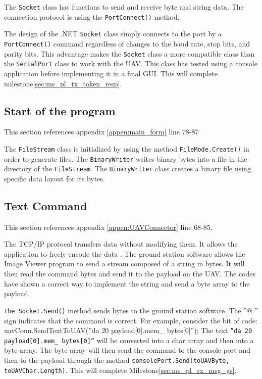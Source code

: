 The \texttt{Socket} class has functions to send and receive byte and string data. The connection protocol is using the \texttt{PortConnect()} method.  
        
The design of the .NET \texttt{Socket} class simply connects to the port by a \texttt{PortConnect()} command regardless of changes to the baud rate, stop bits, and parity bits. 
This advantage makes the \texttt{Socket} class a more compatible class than the \texttt{SerialPort} class to work with the UAV.
This class has tested using a console application before implementing it in a final GUI. 
This will complete milestone\ref{sec:ms_pl_tx_token_resp}.

\subsection{Start of the program}
This section references appendix \ref{appen:main_form} line 78-87

The \texttt{FileStream} class is initialized by using the method \texttt{FileMode.Create()} in order to generate files. The \texttt{BinaryWriter} writes binary bytes into a file in the directory of the \texttt{FileStream}.
The \texttt{BinaryWriter} class creates a binary file using specific data layout for its bytes. 


\subsection{Text Command}
This section references appendix \ref{appen:UAVConnector} line 68-85.

The TCP/IP protocol transfers data without modifying them. 
It allows the application to freely encode the data \cite{davidB}.
The ground station software allows the Image Viewer program to send a stream composed of a string in bytes. It will then read the command bytes and send it to the payload on the UAV. The codes have shown a correct way to implement the string and send a byte array to the payload.

\texttt{The Socket.Send()} method sends bytes to the ground station software. The ''@ '' sign indicates that the command is correct. For example, consider the bit of code: uavConn.SendTextToUAV(''da 20 payload[0].mem\_ bytes[0]'');
The text \texttt{''da 20 payload[0].mem\_ bytes[0]''} will be converted into a char array and then into a byte array. The byte array will then send the command to the console port and then to the payload through the method \texttt{consolePort.Send(toUAVByte, toUAVChar.Length)}. This will complete Milestone\ref{sec:ms_pl_rx_msg_gs}.

